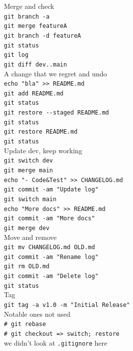 \documentclass[aspectratio=169]{beamer}
\newcommand{\code}[1]{\texttt{\color{mygreen}#1}}
\begin{document}
\begin{frame}[t]
\begin{columns}[t]
    Merge and check\\
    \code{git branch -a}\\
    \code{git merge featureA}\\
    \code{git branch -d featureA}\\
    \code{git status}\\
    \code{git log}\\
    \code{git diff dev..main}\\[1em]

    A change that we regret and undo\\
    \code{echo "bla" >{}> README.md}\\
    \code{git add README.md}\\
    \code{git status}\\
    \code{git restore -{}-staged README.md}\\
    \code{git status}\\
    \code{git restore README.md}\\
    \code{git status}\\[1em]

    Update dev, keep working\\
    \code{git switch dev}\\
    \code{git merge main}\\
    \code{echo "- Code\&Test" >{}> CHANGELOG.md}\\
    \code{git commit -am "Update log"}\\
    \code{git switch main}\\
    \code{echo "More docs" >{}> README.md}\\
    \code{git commit -am "More docs"}\\
    \code{git merge dev}\\[1em]

    Move and remove\\
    \code{git mv CHANGELOG.md OLD.md}\\
    \code{git commit -am "Rename log"}\\
    \code{git rm OLD.md}\\
    \code{git commit -am "Delete log"}\\
    \code{git status}\\[1em]

    Tag\\
    \code{git tag -a v1.0 -m "Initial Release"}\\[1em]

    Notable ones not used\\
    \code{\# git rebase}\\
    \code{\# git checkout => switch; restore}\\
    we didn't look at \code{.gitignore} here

  \end{columns}

\end{frame}
\end{document}
